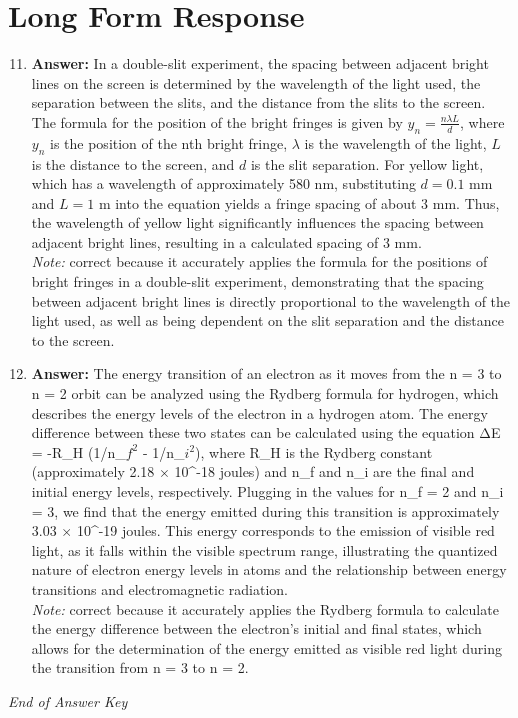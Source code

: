 \documentclass[12pt]{article}
\begin{document}
\section*{Long Form Response}
\begin{enumerate}[label=\arabic*.]
\setcounter{enumi}{10}
\item \textbf{Answer:} In a double-slit experiment, the spacing between adjacent bright lines on the screen is determined by the wavelength of the light used, the separation between the slits, and the distance from the slits to the screen. The formula for the position of the bright fringes is given by \( y_n = \frac{n \lambda L}{d} \), where \( y_n \) is the position of the nth bright fringe, \( \lambda \) is the wavelength of the light, \( L \) is the distance to the screen, and \( d \) is the slit separation. For yellow light, which has a wavelength of approximately 580 nm, substituting \( d = 0.1 \) mm and \( L = 1 \) m into the equation yields a fringe spacing of about 3 mm. Thus, the wavelength of yellow light significantly influences the spacing between adjacent bright lines, resulting in a calculated spacing of 3 mm.
\\ \textit{Note:} correct because it accurately applies the formula for the positions of bright fringes in a double-slit experiment, demonstrating that the spacing between adjacent bright lines is directly proportional to the wavelength of the light used, as well as being dependent on the slit separation and the distance to the screen.
\item \textbf{Answer:} The energy transition of an electron as it moves from the n = 3 to n = 2 orbit can be analyzed using the Rydberg formula for hydrogen, which describes the energy levels of the electron in a hydrogen atom. The energy difference between these two states can be calculated using the equation ΔE = -R\_H (1/n\_$f^2$ - 1/n\_$i^2$), where R\_H is the Rydberg constant (approximately 2.18 \ensuremath{\times} 10^-18 joules) and n\_f and n\_i are the final and initial energy levels, respectively. Plugging in the values for n\_f = 2 and n\_i = 3, we find that the energy emitted during this transition is approximately 3.03 \ensuremath{\times} 10^-19 joules. This energy corresponds to the emission of visible red light, as it falls within the visible spectrum range, illustrating the quantized nature of electron energy levels in atoms and the relationship between energy transitions and electromagnetic radiation.
\\ \textit{Note:} correct because it accurately applies the Rydberg formula to calculate the energy difference between the electron's initial and final states, which allows for the determination of the energy emitted as visible red light during the transition from n = 3 to n = 2.
\end{enumerate}

\vfill
\noindent\textit{End of Answer Key}
\end{document}

